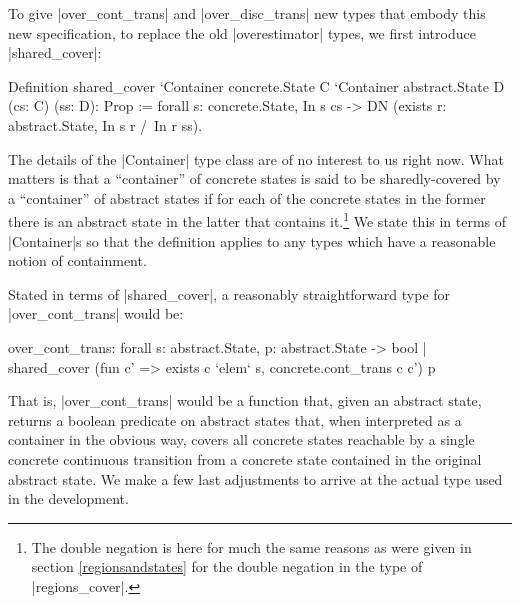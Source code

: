 \documentclass[runningheads]{llncs}
\begin{document}
To give |over_cont_trans| and |over_disc_trans| new types that embody this new specification, to replace the old |overestimator| types, we first introduce |shared_cover|:
\begin{code}
  Definition shared_cover
    `{Container concrete.State C} `{Container abstract.State D}
      (cs: C) (ss: D): Prop :=
        forall s: concrete.State, In s cs -> DN (exists r: abstract.State, In s r /\ In r ss).
\end{code}
The details of the |Container| type class are of no interest to us right now. What matters is that a ``container'' of concrete states is said to be sharedly-covered by a ``container'' of abstract states if for each of the concrete states in the former there is an abstract state in the latter that contains it.\footnote{The double negation is here for much the same reasons as were given in section \ref{regionsandstates} for the double negation in the type of |regions_cover|.} We state this in terms of |Container|s so that the definition applies to any types which have a reasonable notion of containment.

Stated in terms of |shared_cover|, a reasonably straightforward type for |over_cont_trans| would be:
\begin{code}
over_cont_trans: forall s: abstract.State,
  { p: abstract.State -> bool |
    shared_cover (fun c' => exists c `elem` s, concrete.cont_trans c c') p }
\end{code}
That is, |over_cont_trans| would be a function that, given an abstract state, returns a boolean predicate on abstract states that, when interpreted as a container in the obvious way, covers all concrete states reachable by a single concrete continuous transition from a concrete state contained in the original abstract state. We make a few last adjustments to arrive at the actual type used in the development.
\end{document}
